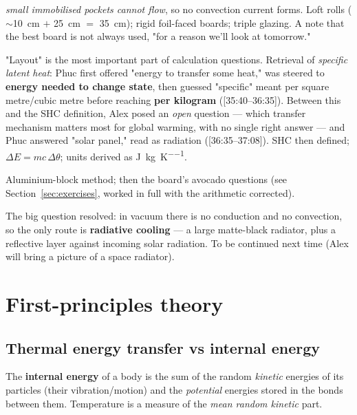 \documentclass[11pt,a4paper]{article}
\newcommand{\ts}[1]{\textup{[#1]}}       %
\newcommand{\dtheta}{\Delta\theta}
\newcommand{\dE}{\Delta E}
\begin{document}
\begin{description}[leftmargin=0pt,itemsep=3pt,font=\normalfont\bfseries]
  \emph{small immobilised pockets cannot flow}, so no convection current forms. Loft rolls
  ($\sim$\SI{10}{cm} $+$ \SI{25}{cm} $=$ \SI{35}{cm}); rigid foil-faced boards; triple
  glazing. A note that the best board is not always used, "for a reason we'll look at
  tomorrow."
\item[\ts{35:04--38:28} Into calculations: SHC.] "Layout" is the most important part of
  calculation questions. Retrieval of \emph{specific latent heat}: Phuc first offered "energy
  to transfer some heat," was steered to \textbf{energy needed to change state}, then guessed
  "specific" meant per square metre/cubic metre before reaching \textbf{per kilogram}
  (\ts{35:40--36:35}). Between this and the SHC definition, Alex posed an \emph{open}
  question --- which transfer mechanism matters most for global warming, with no single right
  answer --- and Phuc answered "solar panel," read as radiation (\ts{36:35--37:08}). SHC then
  defined; $\dE = mc\,\dtheta$; units derived as \si{\joule\per\kilogram\per\kelvin}.
\item[\ts{38:36--41:41} SHC practical and the avocado calculations.] Aluminium-block
  method; then the board's avocado questions (see Section~\ref{sec:exercises}, worked in
  full with the arithmetic corrected).
\item[\ts{41:49--48:10} Space-cooling answer.] The big question resolved: in vacuum there
  is no conduction and no convection, so the only route is \textbf{radiative cooling} ---
  a large matte-black radiator, plus a reflective layer against incoming solar radiation.
  To be continued next time (Alex will bring a picture of a space radiator).
\end{description}

\clearpage
\section{First-principles theory}
\label{sec:theory}

\subsection{Thermal energy transfer vs internal energy}

\begin{defbox}
The \textbf{internal energy} of a body is the sum of the random \emph{kinetic} energies of
its particles (their vibration/motion) and the \emph{potential} energies stored in the
bonds between them. Temperature is a measure of the \emph{mean random kinetic} part.
\end{defbox}
\end{document}
